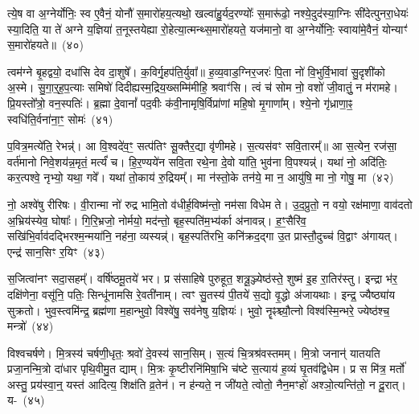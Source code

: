 त्ये॒ष वा अ॒ग्नेर्योनिः॒ स्व ए॒वैनं॒ योनौ॑ स॒मारो॑हय॒त्यथो॒ खल्वा॑हु॒र्यद॒रण्योः᳚ स॒मारू॑ढो॒ नश्ये॒दुद॑स्या॒ग्निः सी॑देत्पुनरा॒धेयः॑ स्या॒दिति॒ या ते॑ अग्ने य॒ज्ञिया॑ त॒नूस्तयेह्या रो॒हेत्या॒त्मन्थ्स॒मारो॑हयते॒ यज॑मानो॒ वा अ॒ग्नेर्योनिः॒ स्वाया॑मे॒वैनं॒ योन्याꣳ॑ स॒मारो॑हयते॥~(४०)

{}%

त्वम॑ग्ने बृ॒हद्वयो॒ दधा॑सि देव दा॒शुषे᳚। क॒विर्गृ॒हप॑ति॒र्युवा᳚॥ ह॒व्य॒वाड॒ग्निर॒जरः॑ पि॒ता नो॑ वि॒भुर्वि॒भावा॑ सु॒दृशी॑को अ॒स्मे। सु॒गा॒र्॒\mbox{}ह॒प॒त्याः समिषो॑ दिदीह्यस्म॒द्रिय॒ख्सम्मि॑मीहि॒ श्रवाꣳ॑सि। त्वं च॑ सोम नो॒ वशो॑ जी॒वातुं॒ न म॑रामहे। प्रि॒यस्तो᳚त्रो॒ वन॒स्पतिः॑। ब्र॒ह्मा दे॒वानां᳚ पद॒वीः क॑वी॒नामृषि॒र्विप्रा॑णां महि॒षो मृ॒गाणा᳚म्। श्ये॒नो गृ॑ध्राणा॒ꣴ॒ स्वधि॑ति॒र्वना॑ना॒ꣳ॒ सोमः॑~(४१)

प॒वित्र॒मत्ये॑ति॒ रेभन्न्॑। आ वि॒श्वदे॑व॒ꣳ॒ सत्प॑तिꣳ सू॒क्तैर॒द्या वृ॑णीमहे। स॒त्यस॑वꣳ सवि॒तारम्᳚॥ आ स॒त्येन॒ रज॑सा॒ वर्त॑मानो निवे॒शय॑न्न॒मृतं॒ मर्त्यं॑ च। हि॒र॒ण्यये॑न सवि॒ता रथे॒ना दे॒वो या॑ति॒ भुव॑ना वि॒पश्यन्न्॑। यथा॑ नो॒ अदि॑तिः॒ कर॒त्पश्वे॒ नृभ्यो॒ यथा॒ गवे᳚। यथा॑ तो॒काय॑ रु॒द्रियम्᳚। मा न॑स्तो॒के तन॑ये॒ मा न॒ आयु॑षि॒ मा नो॒ गोषु॒ मा~(४२)

नो॒ अश्वे॑षु रीरिषः। वी॒रान्मा नो॑ रुद्र भामि॒तो व॑धीर्\mbox{}ह॒विष्म॑न्तो॒ नम॑सा विधेम ते। उ॒द॒प्रुतो॒ न वयो॒ रक्ष॑माणा॒ वाव॑दतो अ॒भ्रिय॑स्येव॒ घोषाः᳚। गि॒रि॒भ्रजो॒ नोर्मयो॒ मद॑न्तो॒ बृह॒स्पति॑म॒भ्य॑र्का अ॑नावन्न्। ह॒ꣳ॒सैरि॑व॒ सखि॑भि॒र्वाव॑दद्भिरश्म॒न्मया॑नि॒ नह॑ना॒ व्यस्यन्न्॑। बृह॒स्पति॑रभि॒ कनि॑क्रद॒द्गा उ॒त प्रास्तौ॒दुच्च॑ वि॒द्वाꣳ अ॑गायत्। एन्द्र॑ सान॒सिꣳ र॒यिꣳ~(४३)

स॒जित्वा॑नꣳ सदा॒सहम्᳚। वर्\mbox{}षि॑ष्ठमू॒तये॑ भर। प्र स॑साहिषे पुरुहूत॒ शत्रू॒ञ्ज्येष्ठ॑स्ते॒ शुष्म॑ इ॒ह रा॒तिर॑स्तु। इन्द्रा भ॑र॒ दक्षि॑णेना॒ वसू॑नि॒ पतिः॒ सिन्धू॑नामसि रे॒वती॑नाम्। त्वꣳ सु॒तस्य॑ पी॒तये॑ स॒द्यो वृ॒द्धो अ॑जायथाः। इन्द्र॒ ज्यैष्ठ्या॑य सुक्रतो। भुव॒स्त्वमि॑न्द्र॒ ब्रह्म॑णा म॒हान्भुवो॒ विश्वे॑षु॒ सव॑नेषु य॒ज्ञियः॑। भुवो॒ नॄꣴश्च्यौ॒त्नो विश्व॑स्मि॒न्भरे॒ ज्येष्ठ॑श्च॒ मन्त्रो॑~(४४)

विश्वचर्\mbox{}षणे। मि॒त्रस्य॑ चर्\mbox{}षणी॒धृतः॒ श्रवो॑ दे॒वस्य॑ सान॒सिम्। स॒त्यं चि॒त्रश्र॑वस्तमम्। मि॒त्रो जनान्॑ यातयति प्रजा॒नन्मि॒त्रो दा॑धार पृथि॒वीमु॒त द्याम्। मि॒त्रः कृ॒ष्टीरनि॑मिषा॒भि च॑ष्टे स॒त्याय॑ ह॒व्यं घृ॒तव॑द्विधेम। प्र स मि॑त्र॒ मर्तो॑ अस्तु॒ प्रय॑स्वा॒न्॒ यस्त॑ आदित्य॒ शिक्ष॑ति व्र॒तेन॑। न ह॑न्यते॒ न जी॑यते॒ त्वोतो॒ नैन॒मꣳहो॑ अश्ञो॒त्यन्ति॑तो॒ न दू॒रात्। य-~(४५)

